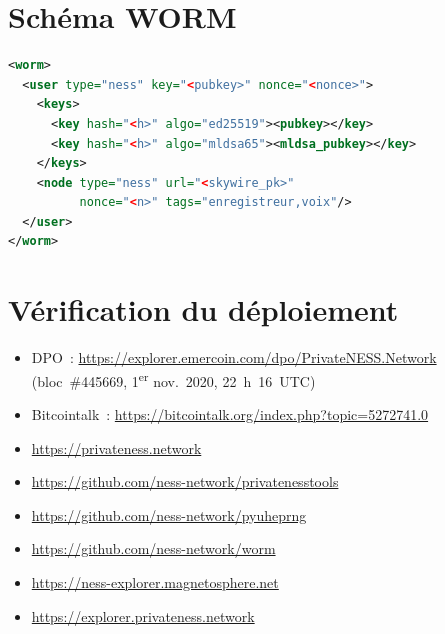 \documentclass[11pt,a4paper]{article}
\theoremstyle{definition}
\begin{document}
\section{Schéma WORM}
\label{app:worm}

\begin{lstlisting}[language=XML]
<worm>
  <user type="ness" key="<pubkey>" nonce="<nonce>">
    <keys>
      <key hash="<h>" algo="ed25519"><pubkey></key>
      <key hash="<h>" algo="mldsa65"><mldsa_pubkey></key>
    </keys>
    <node type="ness" url="<skywire_pk>"
          nonce="<n>" tags="enregistreur,voix"/>
  </user>
</worm>
\end{lstlisting}

\section{Vérification du déploiement}
\label{app:deployment}

\begin{itemize}
  \item DPO~: \url{https://explorer.emercoin.com/dpo/PrivateNESS.Network}
        (bloc~\#445669, 1\textsuperscript{er} nov.\ 2020, 22~h~16~UTC)
  \item Bitcointalk~: \url{https://bitcointalk.org/index.php?topic=5272741.0}
  \item \url{https://privateness.network}
  \item \url{https://github.com/ness-network/privatenesstools}
  \item \url{https://github.com/ness-network/pyuheprng}
  \item \url{https://github.com/ness-network/worm}
  \item \url{https://ness-explorer.magnetosphere.net}
  \item \url{https://explorer.privateness.network}
\end{itemize}
\end{document}
